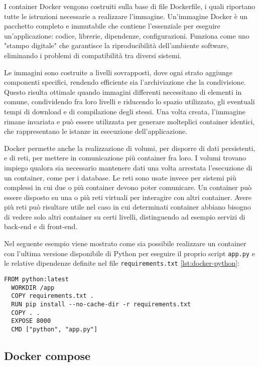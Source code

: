 I container Docker vengono costruiti sulla base di file Dockerfile, i quali riportano tutte le istruzioni necessarie
a realizzare l'immagine. Un'immagine Docker è un pacchetto completo e immutabile che contiene l'essenziale
per eseguire un'applicazione: codice, librerie, dipendenze, configurazioni. Funziona come uno "stampo digitale"
che garantisce la riproducibilità dell'ambiente software, eliminando i problemi di compatibilità tra diversi sistemi.

Le immagini sono costruite a livelli sovrapposti, dove ogni strato aggiunge componenti specifici, rendendo efficiente
sia l'archiviazione che la condivisione. Questo risulta ottimale quando immagini differenti necessitano di elementi
in comune, condividendo fra loro livelli e riducendo lo spazio utilizzato, gli eventuali tempi
di download e di compilazione degli stessi. Una volta creata, l'immagine rimane invariata e può essere utilizzata
per generare molteplici container identici, che rappresentano le istanze in esecuzione dell'applicazione.

Docker permette anche la realizzazione di volumi, per disporre di dati persistenti, e di reti, per mettere
in comunicazione più container fra loro. I volumi trovano impiego qualora sia necessario mantenere dati
una volta arrestata l'esecuzione di un container, come per i database. Le reti sono usate invece per sistemi
più complessi in cui due o più container devono poter comunicare. Un container può essere disposto su una o più reti
virtuali per interagire con altri container. Avere più reti può risultare utile nel caso in cui determinati container
abbiano bisogno di vedere solo altri container su certi livelli, distinguendo ad esempio
servizi di back-end e di front-end.

Nel seguente esempio viene mostrato come sia possibile realizzare un container con l'ultima versione disponibile di
Python per eseguire il proprio script \texttt{app.py} e le relative dipendenze definite nel
file \texttt{requirements.txt} \ref{lst:docker-python}:

\begin{lstlisting}[caption={Dockerfile Python}, label=lst:docker-python]
  FROM python:latest
  WORKDIR /app
  COPY requirements.txt .
  RUN pip install --no-cache-dir -r requirements.txt
  COPY . .
  EXPOSE 8000
  CMD ["python", "app.py"]
\end{lstlisting}

\subsection{Docker compose}

